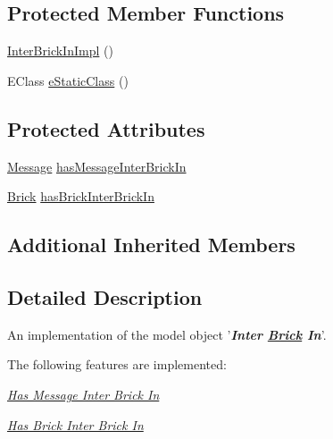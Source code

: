\subsection*{Protected Member Functions}
\begin{DoxyCompactItemize}
\item 
\hyperlink{classshootingmachineemfmodel_1_1impl_1_1_inter_brick_in_impl_aa518cd9483251c415f24bbcdb98c13e3}{Inter\-Brick\-In\-Impl} ()
\item 
E\-Class \hyperlink{classshootingmachineemfmodel_1_1impl_1_1_inter_brick_in_impl_a37db4ac101ffdf4d086262c39be76590}{e\-Static\-Class} ()
\end{DoxyCompactItemize}
\subsection*{Protected Attributes}
\begin{DoxyCompactItemize}
\item 
\hyperlink{interfaceshootingmachineemfmodel_1_1_message}{Message} \hyperlink{classshootingmachineemfmodel_1_1impl_1_1_inter_brick_in_impl_a49940eb99267dfad1b7e79efbec93e4d}{has\-Message\-Inter\-Brick\-In}
\item 
\hyperlink{interfaceshootingmachineemfmodel_1_1_brick}{Brick} \hyperlink{classshootingmachineemfmodel_1_1impl_1_1_inter_brick_in_impl_ae99e687b1771e1b30f4f67fb5c56a6d2}{has\-Brick\-Inter\-Brick\-In}
\end{DoxyCompactItemize}
\subsection*{Additional Inherited Members}


\subsection{Detailed Description}
An implementation of the model object '{\itshape {\bfseries Inter \hyperlink{interfaceshootingmachineemfmodel_1_1_brick}{Brick} In}}'.

The following features are implemented\-: 
\begin{DoxyItemize}
\item \hyperlink{classshootingmachineemfmodel_1_1impl_1_1_inter_brick_in_impl_aa379228bebb5f021ecb19114f8637e3b}{{\itshape Has Message Inter Brick In}} 
\item \hyperlink{classshootingmachineemfmodel_1_1impl_1_1_inter_brick_in_impl_a25afb33543b6066eb2bfb46b037c4eb5}{{\itshape Has Brick Inter Brick In}} 
\end{DoxyItemize}

